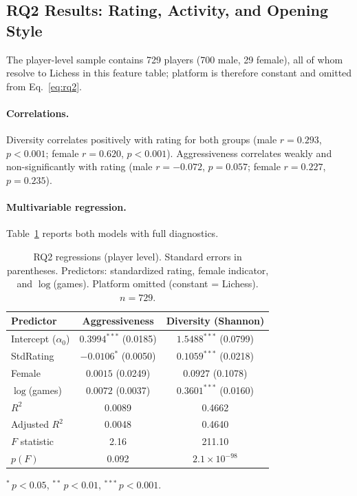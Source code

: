 \documentclass[11pt,a4paper]{article}
\begin{document}
\subsection{RQ2 Results: Rating, Activity, and Opening Style}
\label{sec:rq2res}
The player-level sample contains 729 players (700 male, 29 female), all of whom resolve to
Lichess in this feature table; platform is therefore constant and omitted from
Eq.~\eqref{eq:rq2}.

\paragraph{Correlations.}
Diversity correlates positively with rating for both groups (male $r=0.293$, $p<0.001$;
female $r=0.620$, $p<0.001$). Aggressiveness correlates weakly and non-significantly with
rating (male $r=-0.072$, $p=0.057$; female $r=0.227$, $p=0.235$).

\paragraph{Multivariable regression.}
Table~\ref{tab:rq2reg} reports both models with full diagnostics.

\begin{table}[H]
\caption{RQ2 regressions (player level). Standard errors in parentheses. Predictors:
standardized rating, female indicator, and $\log$(games). Platform omitted (constant =
Lichess). $n=729$.}
\label{tab:rq2reg}
\centering
\begin{tabular}{lcc}
\toprule
Predictor & Aggressiveness & Diversity (Shannon) \\
\midrule
Intercept ($\alpha_0$)   & $0.3994^{***}$ (0.0185) & $1.5488^{***}$ (0.0799) \\
StdRating                & $-0.0106^{*}$ (0.0050)  & $0.1059^{***}$ (0.0218) \\
Female                   & $0.0015$ (0.0249)       & $0.0927$ (0.1078) \\
$\log$(games)            & $0.0072$ (0.0037)       & $0.3601^{***}$ (0.0160) \\
\midrule
$R^2$                    & 0.0089                  & 0.4662 \\
Adjusted $R^2$           & 0.0048                  & 0.4640 \\
$F$ statistic            & 2.16                    & 211.10 \\
$p(F)$                   & 0.092                   & $2.1\times10^{-98}$ \\
\bottomrule
\end{tabular}

\vspace{2pt}
{\footnotesize $^{*}\,p<0.05$, $^{**}\,p<0.01$, $^{***}\,p<0.001$.}
\end{table}
\end{document}
